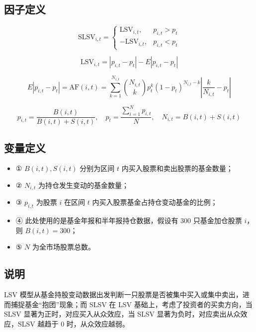 \documentclass{article}
\begin{document}
\subsection{因子定义}

\begin{equation}
    \mathrm{SLSV}_{i,t} = 
    \begin{cases} 
        \mathrm{LSV}_{i,t}, & p_{i,t} > p_t \\ 
        -\mathrm{LSV}_{i,t}, & p_{i,t} < p_t 
    \end{cases}
\end{equation}

\begin{equation}
    \mathrm{LSV}_{i,t} = |p_{i,t} - p_t| - E|p_{i,t} - p_t|
\end{equation}

\begin{equation}
    E|p_{i,t} - p_t| = \mathrm{AF}(i,t) = \sum_{k=1}^{N_{i,t}} \binom{N_{i,t}}{k} p_t^k (1 - p_t)^{N_{i,t} - k} \left| \frac{k}{N_{i,t}} - p_t \right|
\end{equation}

\begin{equation}
    p_{i,t} = \frac{B(i,t)}{B(i,t) + S(i,t)}, \quad p_t = \frac{\sum_{i=1}^{N} p_{i,t}}{N}, \quad N_{i,t} = B(i,t) + S(i,t)
\end{equation}

\subsection{变量定义}
\begin{itemize}
    \item ① \( B(i,t), S(i,t) \) 分别为区间 \( t \) 内买入股票和卖出股票的基金数量；
    \item ② \( N_{i,t} \) 为持仓发生变动的基金数量；
    \item ③ \( p_{i,t} \) 为股票 \( i \) 在区间 \( t \) 内买入股票基金占持仓变动基金的比例；
    \item ④ 此处使用的是基金年报和半年报持仓数据，假设有 300 只基金加仓股票 \( i \)，则 \( B(i,t) = 300 \)；
    \item ⑤ \( N \) 为全市场股票总数。
\end{itemize}

\subsection{说明}
LSV 模型从基金持股变动数据出发判断一只股票是否被集中买入或集中卖出，进而捕捉基金“抱团”现象；而 SLSV 在 LSV 基础上，考虑了投资者的买卖方向，当 SLSV 显著为正时，对应买入从众效应，当 SLSV 显著为负时，对应卖出从众效应，SLSV 越趋于 0 时，从众效应越弱。
\end{document}
